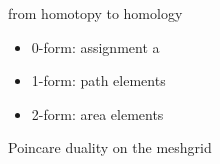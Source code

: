 from homotopy to homology

\begin{itemize}
\item 0-form: assignment a
\item 1-form: path elements
\item 2-form: area elements
\end{itemize}

Poincare duality on the meshgrid
